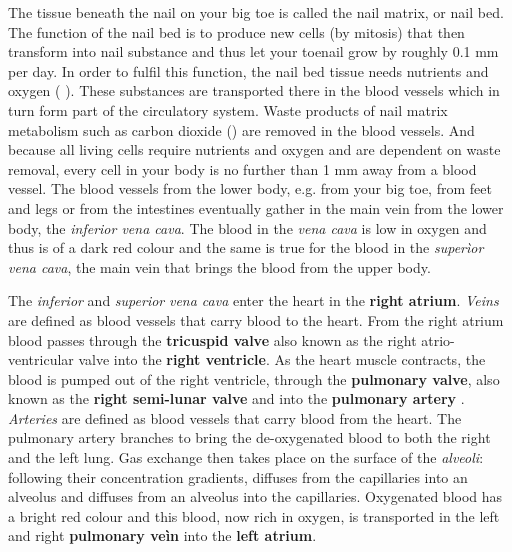  The tissue beneath the nail on your big toe is called the nail matrix, or nail bed. The function of the nail bed is to produce new cells (by mitosis) that then transform into nail substance and thus let your toenail grow by roughly 0.1 mm per day. In order to fulfil this function, the nail bed tissue needs nutrients and oxygen ( ).
These substances are transported there in the blood vessels which in turn form part of the circulatory system. Waste products of nail matrix metabolism such as carbon dioxide  () are removed in the blood vessels. And because all living cells require nutrients and oxygen and are dependent on waste removal, every cell in your body is no further than 1 mm away from a blood vessel. The blood vessels from the lower body, e.g. from your big toe, from feet and legs or from the intestines  eventually gather in the main vein from the lower body, the \textit{inferior vena cava}. The blood in the \textit{vena cava} is low in oxygen and thus is of a dark red colour and the same is true for the blood in the \textit{superìor vena cava}, the main vein that brings the blood from the upper body.

The \textit{inferior} and \textit{superior} \textit{vena cava} enter the heart in the\textbf{ right atrium}. \emph{Veins} are defined as blood vessels that carry blood to the heart. From the right atrium blood passes through the \textbf{tricuspid valve} also known as the right atrio-ventricular valve into the \textbf{right ventricle}. As the heart muscle contracts, the blood is pumped out of the right ventricle, through the \textbf{pulmonary valve}, also known as the \textbf{right semi-lunar valve} and into the \textbf{pulmonary artery} .  \emph{Arteries} are defined as blood vessels that carry blood from the heart. The pulmonary artery branches to bring the de-oxygenated blood to both the right and the left lung. Gas exchange then takes place on the surface of the \emph{alveoli}: following their concentration gradients,   diffuses from the capillaries into an alveolus and   diffuses from an alveolus into the capillaries. Oxygenated blood has a bright red colour and this blood, now rich in oxygen, is transported in the left and right \textbf{pulmonary veìn}  into the \textbf{left atrium}.

